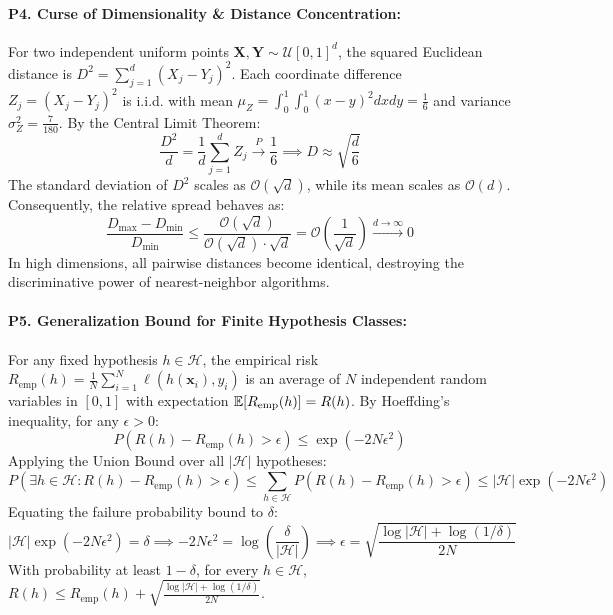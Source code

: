 \paragraph{P4. Curse of Dimensionality \& Distance Concentration:}
For two independent uniform points $\mathbf{X}, \mathbf{Y} \sim \mathcal{U}[0, 1]^d$, the squared Euclidean distance is $D^2 = \sum_{j=1}^d (X_j - Y_j)^2$.
Each coordinate difference $Z_j = (X_j - Y_j)^2$ is i.i.d. with mean $\mu_Z = \int_0^1 \int_0^1 (x - y)^2 dx dy = \frac{1}{6}$ and variance $\sigma_Z^2 = \frac{7}{180}$.
By the Central Limit Theorem:
\begin{equation*}
\frac{D^2}{d} = \frac{1}{d} \sum_{j=1}^d Z_j \xrightarrow{P} \frac{1}{6} \implies D \approx \sqrt{\frac{d}{6}}
\end{equation*}
The standard deviation of $D^2$ scales as $\mathcal{O}(\sqrt{d})$, while its mean scales as $\mathcal{O}(d)$. Consequently, the relative spread behaves as:
\begin{equation*}
\frac{D_{\max} - D_{\min}}{D_{\min}} \le \frac{\mathcal{O}(\sqrt{d})}{\mathcal{O}(\sqrt{d}) \cdot \sqrt{d}} = \mathcal{O}\left(\frac{1}{\sqrt{d}}\right) \xrightarrow{d \to \infty} 0
\end{equation*}
In high dimensions, all pairwise distances become identical, destroying the discriminative power of nearest-neighbor algorithms.

\paragraph{P5. Generalization Bound for Finite Hypothesis Classes:}
For any fixed hypothesis $h \in \mathcal{H}$, the empirical risk $R_{\text{emp}}(h) = \frac{1}{N}\sum_{i=1}^N \ell(h(\mathbf{x}_i), y_i)$ is an average of $N$ independent random variables in $[0, 1]$ with expectation $\operatorname{\mathbb{E}}[R_{\text{emp}}(h)] = R(h)$.
By Hoeffding's inequality, for any $\epsilon > 0$:
\begin{equation*}
P\left( R(h) - R_{\text{emp}}(h) > \epsilon \right) \le \exp\left( -2N\epsilon^2 \right)
\end{equation*}
Applying the Union Bound over all $|\mathcal{H}|$ hypotheses:
\begin{equation*}
P\left( \exists h \in \mathcal{H}: R(h) - R_{\text{emp}}(h) > \epsilon \right) \le \sum_{h \in \mathcal{H}} P\left( R(h) - R_{\text{emp}}(h) > \epsilon \right) \le |\mathcal{H}| \exp\left( -2N\epsilon^2 \right)
\end{equation*}
Equating the failure probability bound to $\delta$:
\begin{equation*}
|\mathcal{H}| \exp\left( -2N\epsilon^2 \right) = \delta \implies -2N\epsilon^2 = \log\left(\frac{\delta}{|\mathcal{H}|}\right) \implies \epsilon = \sqrt{\frac{\log|\mathcal{H}| + \log(1/\delta)}{2N}}
\end{equation*}
With probability at least $1 - \delta$, for every $h \in \mathcal{H}$, $R(h) \le R_{\text{emp}}(h) + \sqrt{\frac{\log|\mathcal{H}| + \log(1/\delta)}{2N}}$.

